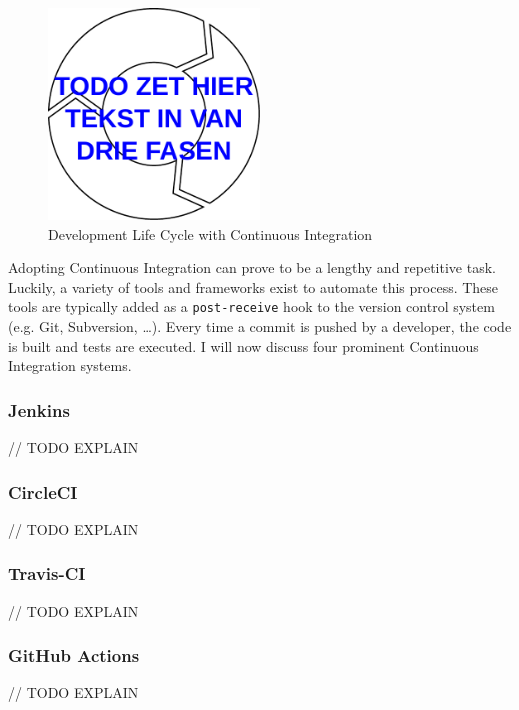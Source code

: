 \begin{figure}[htbp!]
	\centering
	\includegraphics[width=0.5\textwidth]{assets/ci-lifecycle.pdf}
	\caption{Development Life Cycle with Continuous Integration}
	\label{fig:agile-ci-lifecycle}
\end{figure}

\noindent Adopting Continuous Integration can prove to be a lengthy and repetitive task. Luckily, a variety of tools and frameworks exist to automate this process. These tools are typically added as a \texttt{post-receive} hook to the version control system (e.g. Git, Subversion, \dots). Every time a commit is pushed by a developer, the code is built and tests are executed. I will now discuss four prominent Continuous Integration systems.

\subsubsection{Jenkins}
// TODO EXPLAIN

\subsubsection{CircleCI}
// TODO EXPLAIN

\subsubsection{Travis-CI}
// TODO EXPLAIN

\subsubsection{GitHub Actions}
// TODO EXPLAIN
